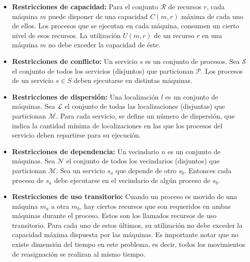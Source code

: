 \documentclass[../informe2.tex]{subfiles}
\begin{document}
\begin{itemize}

	\item \textbf{Restricciones de capacidad:} Para el conjunto $\mathcal{R}$ de recursos $r$, cada máquina $m$ puede disponer de una capacidad $C(m,r)$ máxima de cada uno de ellos. Los procesos que se ejecutan en cada máquina, consumen un cierto nivel de esos recursos. La utilización $U(m,r)$ de un recurso $r$ en una máquina $m$ no debe exceder la capacidad de éste.

	\item \textbf{Restricciones de conflicto:} Un servicio $s$ es un conjunto de procesos. Sea $\mathcal{S}$ el conjunto de todos los servicios (disjuntos) que particionan $\mathcal{P}$. Los procesos de un servicio $s \in S$ deben ejecutarse en distintas máquinas.

	\item \textbf{Restricciones de dispersión:} Una localización $l$ es un conjunto de máquinas. Sea $\mathcal{L}$ el conjunto de todas las localizaciones (disjuntas) que particionan $\mathcal{M}$. Para cada servicio, se define un número de dispersión, que indica la cantidad mínima de localizaciones en las que los procesos del servicio deben repartirse para su ejecución.

	\item \textbf{Restricciones de dependencia:} Un vecindario $n$ es un conjunto de máquinas. Sea $\mathcal{N}$ el conjunto de todos los vecindarios (disjuntos) que particionan $\mathcal{M}$. Sea un servicio $s_a$ que depende de otro $s_b$. Entonces cada proceso de $s_a$ debe ejecutarse en el vecindario de algún proceso de $s_b$.

	\item \textbf{Restricciones de uso transitorio:} Cuando un proceso es movido de una máquina $m_a$ a otra $m_b$, hay ciertos recursos que son requeridos en ambas máquinas durante el proceso. Estos son los llamados recursos de uso transitorio. Para cada uno de estos últimos, su utilización no debe exceder la capacidad máxima dispuesta por las máquinas. Es importante notar que no existe dimensión del tiempo en este problema, es decir, todos los movimientos de reasignación se realizan al mismo tiempo.

\end{itemize}
\end{document}
